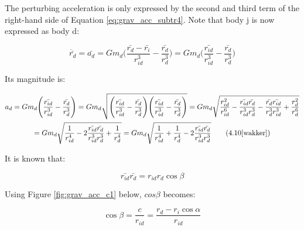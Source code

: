 \noindent The perturbing acceleration is only expressed by the second and third term of the right-hand side of Equation \ref{eq:grav_acc_subtr4}. Note that body j is now expressed as body d:

\begin{equation}
    \ddot{\bar{r_{d}}} = \bar{a_{d}} = G m_{d} \Bigg( \frac{\bar{r_{d}} - \bar{r_{i}}}{r_{id}^3} - \frac{\bar{r_{d}}}{r_{d}^3} \Bigg) = G m_{d} \Bigg( \frac{\bar{r_{id}}}{r_{id}^3} - \frac{\bar{r_{d}}}{r_{d}^3} \Bigg)
    \label{eq:grav_acc_c3}
\end{equation}

\noindent Its magnitude is:

\begin{multline}
    a_{d} = G m_{d} \Bigg( \frac{\bar{r_{id}}}{r_{id}^3} - \frac{\bar{r_{d}}}{r_{d}^3} \Bigg) 
    = G m_{d} \sqrt{ \Bigg( \frac{\bar{r_{id}}}{r_{id}^3} - \frac{\bar{r_{d}}}{r_{d}^3} \Bigg) \Bigg( \frac{\bar{r_{id}}}{r_{id}^3} - \frac{\bar{r_{d}}}{r_{d}^3} \Bigg) } 
    = G m_{d} \sqrt{ \frac{r_{id}^2}{r_{id}^6} - \frac{\bar{r_{id}}\bar{r_{d}}}{r_{id}^3 r_{d}^3} - \frac{\bar{r_{d}}\bar{r_{id}}}{r_{d}^3 r_{id}^3} + \frac{r_{d}^2}{r_{d}^6}} \\
    = G m_{d} \sqrt{ \frac{1}{r_{id}^4} - 2\frac{\bar{r_{id}}\bar{r_{d}}}{r_{id}^3 r_{d}^3} + \frac{1}{r_{d}^4}} 
    = G m_{d} \sqrt{ \frac{1}{r_{id}^4} + \frac{1}{r_{d}^4} - 2\frac{\bar{r_{id}}\bar{r_{d}}}{r_{id}^3 r_{d}^3}}
    \tag{4.10\cite{wakker}}
    \label{eq:grav_acc_clong}
\end{multline}

\noindent It is known that:

\begin{equation}
    \bar{r_{id}}\bar{r_{d}} = r_{id} r_{d} \cos{\beta}
    \label{eq:grav_acc_c4}
\end{equation}

\noindent Using Figure \ref{fig:grav_acc_c1} below, $cos{\beta}$ becomes:

\begin{equation}
    \cos{\beta} = \frac{c}{r_{id}} = \frac{r_{d}-r_{i}\cos{\alpha}}{r_{id}} 
    \label{eq:grav_acc_c5}
\end{equation}

